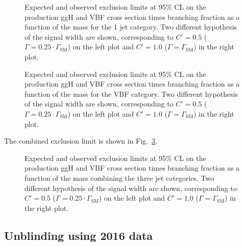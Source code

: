 \begin{figure}[htb]
\centering
{}
\caption{
   Expected and observed exclusion limits at 95\% CL on the production ggH and VBF cross section times branching fraction as a function of the mass for the 1 jet category. Two different hypothesis of the signal width are shown, corresponding to $C'=0.5$ ($\Gamma = 0.25\cdot\Gamma_\mathrm{SM}$) on the left plot and $C'=1.0$ ($\Gamma = \Gamma_\mathrm{SM}$) in the right plot.}
    \label{fig:limit_1j_unblind}
\end{figure}

\begin{figure}[htb]
\centering
{}
\caption{
   Expected and observed exclusion limits at 95\% CL on the production ggH and VBF cross section times branching fraction as a function of the mass for the VBF category. Two different hypothesis of the signal width are shown, corresponding to $C'=0.5$ ($\Gamma = 0.25\cdot\Gamma_\mathrm{SM}$) on the left plot and $C'=1.0$ ($\Gamma = \Gamma_\mathrm{SM}$) in the right plot.}
    \label{fig:limit_2j_unblind}
\end{figure}

The combined exclusion limit is shown in Fig.~\ref{fig:limit_comb_unblind}.

\begin{figure}[htb]
\centering
{}
\caption{
   Expected and observed exclusion limits at 95\% CL on the production ggH and VBF cross section times branching fraction as a function of the mass combining the three jet categories. Two different hypothesis of the signal width are shown, corresponding to $C'=0.5$ ($\Gamma = 0.25\cdot\Gamma_\mathrm{SM}$) on the left plot and $C'=1.0$ ($\Gamma = \Gamma_\mathrm{SM}$) in the right plot.}
    \label{fig:limit_comb_unblind}
\end{figure}


\clearpage
\subsection{Unblinding using 2016 data}
